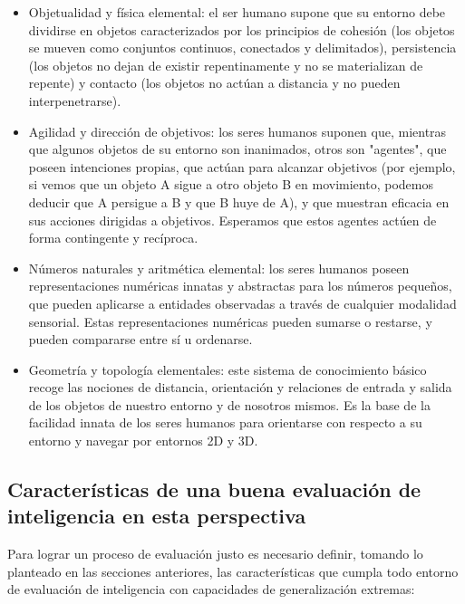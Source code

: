 \begin{itemize}

\item Objetualidad y física elemental: el ser humano supone que su entorno debe dividirse en objetos caracterizados por los principios de cohesión (los objetos se mueven como conjuntos continuos, conectados y delimitados), persistencia (los objetos no dejan de existir repentinamente y no se materializan de repente) y contacto (los objetos no actúan a distancia y no pueden interpenetrarse).

\item Agilidad y dirección de objetivos: los seres humanos suponen que, mientras que algunos objetos de su entorno son inanimados, otros son "agentes", que poseen intenciones propias, que actúan para alcanzar objetivos (por ejemplo, si vemos que un objeto A sigue a otro objeto B en movimiento, podemos deducir que A persigue a B y que B huye de A), y que muestran eficacia en sus acciones dirigidas a objetivos. Esperamos que estos agentes actúen de forma contingente y recíproca.

\item Números naturales y aritmética elemental: los seres humanos poseen representaciones numéricas innatas y abstractas para los números pequeños, que pueden aplicarse a entidades observadas a través de cualquier modalidad sensorial. Estas representaciones numéricas pueden sumarse o restarse, y pueden compararse entre sí u ordenarse.

\item Geometría y topología elementales: este sistema de conocimiento básico recoge las nociones de distancia, orientación y relaciones de entrada y salida de los objetos de nuestro entorno y de nosotros mismos. Es la base de la facilidad innata de los seres humanos para orientarse con respecto a su entorno y navegar por entornos 2D y 3D.
\end{itemize}

\subsection{Características de una buena evaluación de inteligencia en esta perspectiva}

Para lograr un proceso de evaluación justo es necesario definir, tomando lo planteado en las secciones anteriores, las características que cumpla todo entorno de evaluación de inteligencia con capacidades de generalización extremas:

